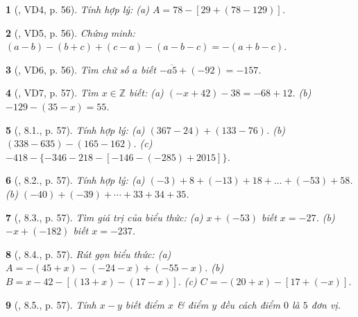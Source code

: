 \documentclass{article}
\newtheorem{baitoan}{}
\begin{document}
\begin{baitoan}[\cite{Binh_boi_duong_Toan_6_tap_1}, VD4, p. 56]
	Tính hợp lý: (a) $A = 78 - [29 + (78 - 129)]$.
\end{baitoan}

\begin{baitoan}[\cite{Binh_boi_duong_Toan_6_tap_1}, VD5, p. 56]
	Chứng minh: $(a - b) - (b + c) + (c - a) - (a - b - c) = -(a + b - c)$.
\end{baitoan}

\begin{baitoan}[\cite{Binh_boi_duong_Toan_6_tap_1}, VD6, p. 56]
	Tìm chữ số $a$ biết $-\overline{a5} + (-92) = -157$.
\end{baitoan}

\begin{baitoan}[\cite{Binh_boi_duong_Toan_6_tap_1}, VD7, p. 57]
	Tìm $x\in\mathbb{Z}$ biết: (a) $(-x + 42) - 38 = -68 + 12$. (b) $-129 - (35 - x) = 55$.
\end{baitoan}

\begin{baitoan}[\cite{Binh_boi_duong_Toan_6_tap_1}, 8.1., p. 57]
	Tính hợp lý: (a) $(367 - 24) + (133 - 76)$. (b) $(338 - 635) - (165 - 162)$. (c) $-418 - \{-346 - 218 - [-146 - (-285) + 2015]\}$.
\end{baitoan}

\begin{baitoan}[\cite{Binh_boi_duong_Toan_6_tap_1}, 8.2., p. 57]
	Tính hợp lý: (a) $(-3) + 8 + (-13) + 18 + \ldots + (-53) + 58$. (b) $(-40) + (-39) + \cdots + 33 + 34 + 35$.
\end{baitoan}

\begin{baitoan}[\cite{Binh_boi_duong_Toan_6_tap_1}, 8.3., p. 57]
	Tìm giá trị của biểu thức: (a) $x + (-53)$ biết $x = -27$. (b) $-x + (-182)$ biết $x = -237$.
\end{baitoan}

\begin{baitoan}[\cite{Binh_boi_duong_Toan_6_tap_1}, 8.4., p. 57]
	Rút gọn biểu thức: (a) $A = -(45 + x) - (-24 - x) + (-55 - x)$. (b) $B = x - 42 - [(13 + x) - (17 - x)]$. (c) $C = -(20 + x) - [17 + (-x)]$.
\end{baitoan}

\begin{baitoan}[\cite{Binh_boi_duong_Toan_6_tap_1}, 8.5., p. 57]
	Tính $x - y$ biết điểm $x$ \& điểm $y$ đều cách điểm $0$ là $5$ đơn vị.
\end{baitoan}
\end{document}
